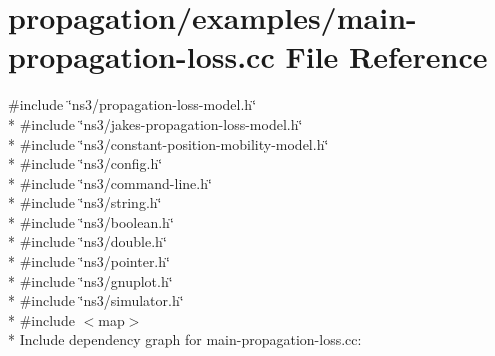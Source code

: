 \hypertarget{main-propagation-loss_8cc}{}\section{propagation/examples/main-\/propagation-\/loss.cc File Reference}
\label{main-propagation-loss_8cc}
{\ttfamily \#include \char`\"{}ns3/propagation-\/loss-\/model.\+h\char`\"{}}\\*
{\ttfamily \#include \char`\"{}ns3/jakes-\/propagation-\/loss-\/model.\+h\char`\"{}}\\*
{\ttfamily \#include \char`\"{}ns3/constant-\/position-\/mobility-\/model.\+h\char`\"{}}\\*
{\ttfamily \#include \char`\"{}ns3/config.\+h\char`\"{}}\\*
{\ttfamily \#include \char`\"{}ns3/command-\/line.\+h\char`\"{}}\\*
{\ttfamily \#include \char`\"{}ns3/string.\+h\char`\"{}}\\*
{\ttfamily \#include \char`\"{}ns3/boolean.\+h\char`\"{}}\\*
{\ttfamily \#include \char`\"{}ns3/double.\+h\char`\"{}}\\*
{\ttfamily \#include \char`\"{}ns3/pointer.\+h\char`\"{}}\\*
{\ttfamily \#include \char`\"{}ns3/gnuplot.\+h\char`\"{}}\\*
{\ttfamily \#include \char`\"{}ns3/simulator.\+h\char`\"{}}\\*
{\ttfamily \#include $<$map$>$}\\*
Include dependency graph for main-\/propagation-\/loss.cc\+:
